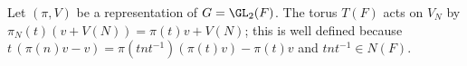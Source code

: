 Let $(\pi,V)$ be a representation of $G=\GL_2(F)$. The torus $T(F)$ acts on $V_N$ by $\pi_N(t)(v+V(N))=\pi(t)v+V(N)$; this is well defined because $t\,(\pi(n)v-v)=\pi(tnt^{-1})(\pi(t)v)-\pi(t)v$ and $tnt^{-1}\in N(F)$.
